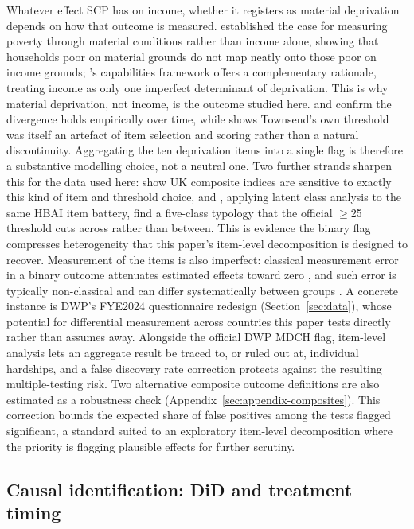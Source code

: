 Whatever effect SCP has on income, whether it registers as material deprivation depends on how that outcome is measured. \citet{townsend1979} established the case for measuring poverty through material conditions rather than income alone, showing that households poor on material grounds do not map neatly onto those poor on income grounds; \citet{sen1985}'s capabilities framework offers a complementary rationale, treating income as only one imperfect determinant of deprivation. This is why material deprivation, not income, is the outcome studied here. \citet{nolanwhelan1996} and \citet{whelanlaytemaitre2004} confirm the divergence holds empirically over time, while \citet{piachaud1981} shows Townsend's own threshold was itself an artefact of item selection and scoring rather than a natural discontinuity. Aggregating the ten deprivation items into a single flag is therefore a substantive modelling choice, not a neutral one. Two further strands sharpen this for the data used here: \citet{mainbradshaw2016} show UK composite indices are sensitive to exactly this kind of item and threshold choice, and \citet{nicoriciuelliot2025}, applying latent class analysis to the same HBAI item battery, find a five-class typology that the official $\geq$25 threshold cuts across rather than between. This is evidence the binary flag compresses heterogeneity that this paper's item-level decomposition is designed to recover. Measurement of the items is also imperfect: classical measurement error in a binary outcome attenuates estimated effects toward zero \citep{boundbrownmathiowetz2001}, and such error is typically non-classical and can differ systematically between groups \citep{boundkrueger1991,meyermoksullivan2015}. A concrete instance is DWP's FYE2024 questionnaire redesign (Section~\ref{sec:data}), whose potential for differential measurement across countries this paper tests directly rather than assumes away. Alongside the official DWP MDCH flag, item-level analysis lets an aggregate result be traced to, or ruled out at, individual hardships, and a \citet{benjaminihochberg1995} false discovery rate correction protects against the resulting multiple-testing risk. Two alternative composite outcome definitions are also estimated as a robustness check (Appendix~\ref{sec:appendix-composites}). This correction bounds the expected share of false positives among the tests flagged significant, a standard suited to an exploratory item-level decomposition where the priority is flagging plausible effects for further scrutiny.

\subsection{Causal identification: DiD and treatment timing}
\label{sec:lit-identification}

